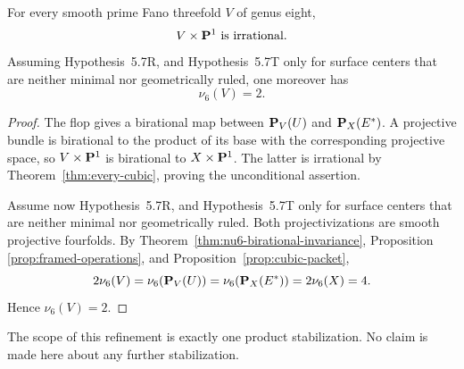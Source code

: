 \begin{corollary}
\label{cor:v14-one-step}
%
%
For every smooth prime Fano threefold \(V\) of genus eight,
\[
  V\times\mathbf P^1\ \text{is irrational}.
\]
Assuming Hypothesis~5.7R, and Hypothesis~5.7T only for surface centers that are
neither minimal nor geometrically ruled, one moreover has
\[
  \nu_6(V)=2.
  \label{eq:v14-stabilization}
\]
\end{corollary}

\begin{proof}
The flop gives a birational map between \(\mathbf P_V(U)\) and
\(\mathbf P_X(E^*)\).  A projective bundle is birational to the product of its
base with the corresponding projective space, so
\(V\times\mathbf P^1\) is birational to \(X\times\mathbf P^1\).  The latter is
irrational by Theorem~\ref{thm:every-cubic}, proving the unconditional
assertion.

Assume now Hypothesis~5.7R, and Hypothesis~5.7T only for surface centers that are
neither minimal nor geometrically ruled.  Both projectivizations are smooth
projective fourfolds.  By Theorem~\ref{thm:nu6-birational-invariance}, Proposition
\ref{prop:framed-operations}, and Proposition~\ref{prop:cubic-packet},
\[
  2\nu_6(V)=\nu_6(\mathbf P_V(U))
  =\nu_6(\mathbf P_X(E^*))=2\nu_6(X)=4.
\]
Hence \(\nu_6(V)=2\).
\end{proof}

The scope of this refinement is exactly one product stabilization.  No claim
is made here about any further stabilization.
